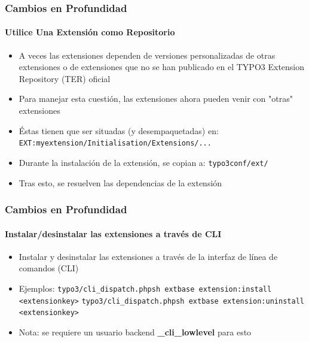 
\begin{frame}[fragile]
	\frametitle{Cambios en Profundidad}
	\framesubtitle{Utilice Una Extensión como Repositorio}

	\begin{itemize}
		\item A veces las extensiones dependen de versiones personalizadas de otras extensiones o de extensiones que no se han publicado en el TYPO3 Extension Repository (TER) oficial
		\item Para manejar esta cuestión, las extensiones ahora pueden venir con "otras" extensiones
		\item Éstas tienen que ser situadas (y desempaquetadas) en:\newline
			\texttt{EXT:myextension/Initialisation/Extensions/...}

		\item Durante la instalación de la extensión, se copian a:\newline
			\texttt{typo3conf/ext/}

		\item Tras esto, se resuelven las dependencias de la extensión
	\end{itemize}

\end{frame}


\begin{frame}[fragile]
	\frametitle{Cambios en Profundidad}
	\framesubtitle{Instalar/desinstalar las extensiones a través de CLI}

	\begin{itemize}
		\item Instalar y desinstalar las extensiones a través de la interfaz de línea de comandos (CLI)
		\item Ejemplos:
			\lstinline!typo3/cli_dispatch.phpsh extbase extension:install <extensionkey>!
			\lstinline!typo3/cli_dispatch.phpsh extbase extension:uninstall <extensionkey>!

		\item Nota: se requiere un usuario backend \textbf{\_cli\_lowlevel} para esto
	\end{itemize}

\end{frame}

